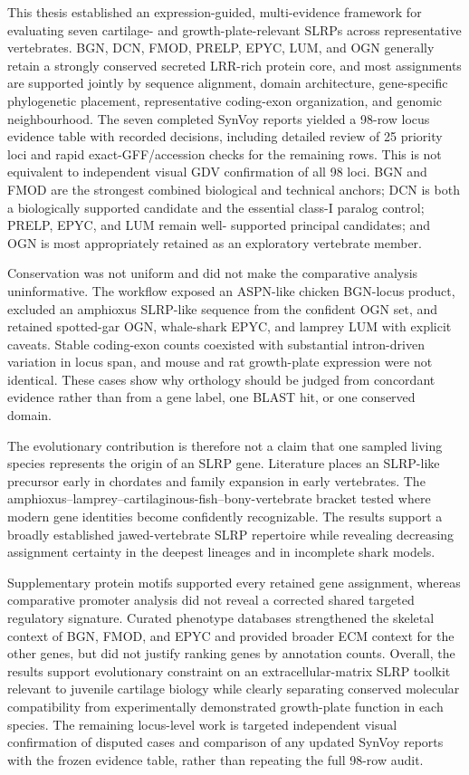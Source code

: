 This thesis established an expression-guided, multi-evidence framework for
evaluating seven cartilage- and growth-plate-relevant SLRPs across
representative vertebrates. BGN, DCN, FMOD, PRELP, EPYC, LUM, and OGN generally
retain a strongly conserved secreted LRR-rich protein core, and most assignments
are supported jointly by sequence alignment, domain architecture, gene-specific
phylogenetic placement, representative coding-exon organization, and genomic
neighbourhood. The seven completed SynVoy reports yielded a 98-row locus
evidence table with recorded decisions, including detailed review of 25
priority loci and rapid exact-GFF/accession checks for the remaining rows.
This is not equivalent to independent visual GDV confirmation of all 98 loci.
BGN and FMOD are the strongest combined
biological and technical anchors; DCN is both a biologically supported candidate
and the essential class-I paralog control; PRELP, EPYC, and LUM remain well-
supported principal candidates; and OGN is most appropriately retained as an
exploratory vertebrate member.

Conservation was not uniform and did not make the comparative analysis
uninformative. The workflow exposed an ASPN-like chicken BGN-locus product,
excluded an amphioxus SLRP-like sequence from the confident OGN set, and retained
spotted-gar OGN, whale-shark EPYC, and lamprey LUM with explicit caveats. Stable
coding-exon counts coexisted with substantial intron-driven variation in locus
span, and mouse and rat growth-plate expression were not identical. These cases
show why orthology should be judged from concordant evidence rather than from a
gene label, one BLAST hit, or one conserved domain.

The evolutionary contribution is therefore not a claim that one sampled living
species represents the origin of an SLRP gene. Literature places an SLRP-like
precursor early in chordates and family expansion in early vertebrates. The
amphioxus--lamprey--cartilaginous-fish--bony-vertebrate bracket tested where
modern gene identities become confidently recognizable. The results support a
broadly established jawed-vertebrate SLRP repertoire while revealing decreasing
assignment certainty in the deepest lineages and in incomplete shark models.

Supplementary protein motifs supported every retained gene assignment, whereas
comparative promoter analysis did not reveal a corrected shared targeted
regulatory signature. Curated phenotype databases strengthened the skeletal
context of BGN, FMOD, and EPYC and provided broader ECM context for the other
genes, but did not justify ranking genes by annotation counts. Overall, the
results support evolutionary constraint on an extracellular-matrix SLRP toolkit
relevant to juvenile cartilage biology while clearly separating conserved
molecular compatibility from experimentally demonstrated growth-plate function
in each species. The remaining locus-level work is targeted independent visual
confirmation of disputed cases and comparison of any updated SynVoy reports
with the frozen evidence table, rather than repeating the full 98-row audit.
